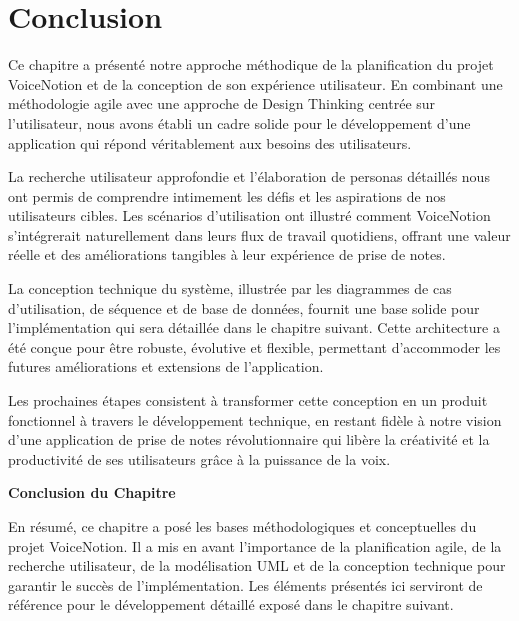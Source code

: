     \section{Conclusion}
    
    Ce chapitre a présenté notre approche méthodique de la planification du projet VoiceNotion et de la conception de son expérience utilisateur. En combinant une méthodologie agile avec une approche de Design Thinking centrée sur l'utilisateur, nous avons établi un cadre solide pour le développement d'une application qui répond véritablement aux besoins des utilisateurs.
    
    La recherche utilisateur approfondie et l'élaboration de personas détaillés nous ont permis de comprendre intimement les défis et les aspirations de nos utilisateurs cibles. Les scénarios d'utilisation ont illustré comment VoiceNotion s'intégrerait naturellement dans leurs flux de travail quotidiens, offrant une valeur réelle et des améliorations tangibles à leur expérience de prise de notes.
    
    La conception technique du système, illustrée par les diagrammes de cas d'utilisation, de séquence et de base de données, fournit une base solide pour l'implémentation qui sera détaillée dans le chapitre suivant. Cette architecture a été conçue pour être robuste, évolutive et flexible, permettant d'accommoder les futures améliorations et extensions de l'application.
    
    Les prochaines étapes consistent à transformer cette conception en un produit fonctionnel à travers le développement technique, en restant fidèle à notre vision d'une application de prise de notes révolutionnaire qui libère la créativité et la productivité de ses utilisateurs grâce à la puissance de la voix. 
    
    \vspace{1cm}
    \begin{center}
    \textbf{\large Conclusion du Chapitre}
    \end{center}
    
        En résumé, ce chapitre a posé les bases méthodologiques et conceptuelles du projet VoiceNotion. Il a mis en avant l'importance de la planification agile, de la recherche utilisateur, de la modélisation UML et de la conception technique pour garantir le succès de l'implémentation. Les éléments présentés ici serviront de référence pour le développement détaillé exposé dans le chapitre suivant.